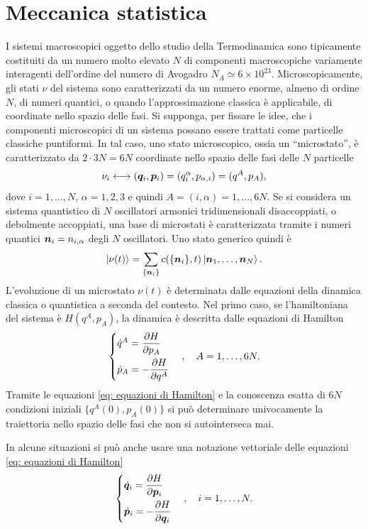\chapter{Meccanica statistica}
I sistemi macroscopici oggetto dello studio della Termodinamica sono tipicamente costituiti da un numero molto elevato $N$ di componenti macroscopiche variamente interagenti dell'ordine del numero di Avogadro $N_A \simeq 6\times 10^{23}$. Microscopicamente, gli stati $\nu$ del sistema sono caratterizzati da un numero enorme, almeno di ordine $N$, di numeri quantici, o quando l'approssimazione classica è applicabile, di coordinate nello spazio delle fasi. Si supponga, per fissare le idee, che i componenti microscopici di un sistema possano essere trattati come particelle classiche puntiformi. In tal caso, uno stato microscopico, ossia un ``microstato'', è caratterizzato da $2\cdot3N = 6N$ coordinate nello spazio delle fasi delle $N$ particelle
\begin{equation}
    \nu_i \longleftrightarrow (\bm{q}_i,\bm{p}_i) = (q^\alpha_i,p_{\alpha,i}) = (q^A,p_A),
\end{equation}
dove $i = 1,\dots,N$, $\alpha=1,2,3$ e quindi $A = (i,\alpha) = 1,\dots,6N$. Se si considera un sistema quantistico di $N$ oscillatori armonici tridimensionali disaccoppiati, o debolmente accoppiati, una base di microstati è caratterizzata tramite i numeri quantici $\bm{n}_i = n_{i,\alpha}$ degli $N$ oscillatori. Uno stato generico quindi è
\begin{equation}
    \ket{\nu(t)} = \sum_{\{\bm{n}_i\}} c(\{\bm{n}_i\},t)\ket{\bm{n}_1,\dots,\bm{n}_N}.
\end{equation}
L'evoluzione di un microstato $\nu(t)$ è determinata dalle equazioni della dinamica classica o quantistica a seconda del contesto. Nel primo caso, se l'hamiltoniana del sistema è $H(q^A,p_A)$, la dinamica è descritta dalle equazioni di Hamilton
\begin{equation}
\label{eq: equazioni di Hamilton}
    \begin{cases}
        \dot{q}^A = \dfrac{\partial H}{\partial p_A} \\[2ex]
        \dot{p}_A = -\dfrac{\partial H}{\partial q^A}
    \end{cases},\quad A = 1,\dots,6N.
\end{equation}
Tramite le equazioni \eqref{eq: equazioni di Hamilton} e la conoscenza esatta di $6N$ condizioni iniziali $\{q^A(0),p_A(0)\}$ si può determinare univocamente la traiettoria nello spazio delle fasi che non si autointerseca mai.
\begin{notz}
    In alcune situazioni si può anche usare una notazione vettoriale delle equazioni \eqref{eq: equazioni di Hamilton}
    \begin{equation}
        \begin{cases}
        \dot{\bm{q}}_i = \dfrac{\partial H}{\partial \bm{p}_i} \\[2ex]
        \dot{\bm{p}}_i = -\dfrac{\partial H}{\partial \bm{q}_i}
    \end{cases},\quad i = 1,\dots,N.
    \end{equation}
\end{notz}
